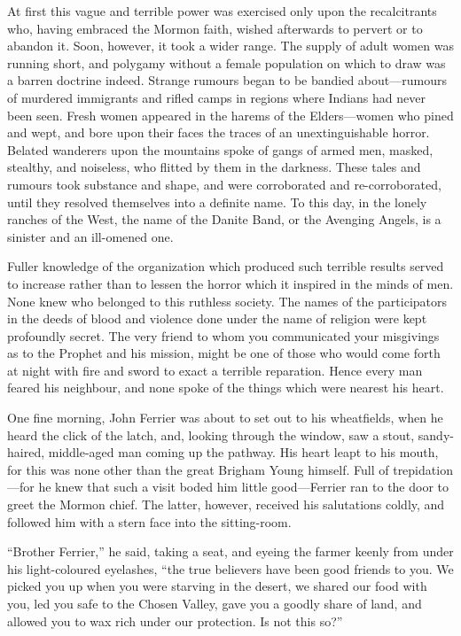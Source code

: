 \documentclass[12pt]{book}
\begin{document}
At first this vague and terrible power was exercised only upon the recalcitrants who, having embraced the Mormon faith, wished afterwards to pervert or to abandon it. Soon, however, it took a wider range. The supply of adult women was running short, and polygamy without a female population on which to draw was a barren doctrine indeed. Strange rumours began to be bandied about—rumours of murdered immigrants and rifled camps in regions where Indians had never been seen. Fresh women appeared in the harems of the Elders—women who pined and wept, and bore upon their faces the traces of an unextinguishable horror. Belated wanderers upon the mountains spoke of gangs of armed men, masked, stealthy, and noiseless, who flitted by them in the darkness. These tales and rumours took substance and shape, and were corroborated and re-corroborated, until they resolved themselves into a definite name. To this day, in the lonely ranches of the West, the name of the Danite Band, or the Avenging Angels, is a sinister and an ill-omened one. 

Fuller knowledge of the organization which produced such terrible results served to increase rather than to lessen the horror which it inspired in the minds of men. None knew who belonged to this ruthless society. The names of the participators in the deeds of blood and violence done under the name of religion were kept profoundly secret. The very friend to whom you communicated your misgivings as to the Prophet and his mission, might be one of those who would come forth at night with fire and sword to exact a terrible reparation. Hence every man feared his neighbour, and none spoke of the things which were nearest his heart. 

One fine morning, John Ferrier was about to set out to his wheatfields, when he heard the click of the latch, and, looking through the window, saw a stout, sandy-haired, middle-aged man coming up the pathway. His heart leapt to his mouth, for this was none other than the great Brigham Young himself. Full of trepidation—for he knew that such a visit boded him little good—Ferrier ran to the door to greet the Mormon chief. The latter, however, received his salutations coldly, and followed him with a stern face into the sitting-room. 

“Brother Ferrier,” he said, taking a seat, and eyeing the farmer keenly from under his light-coloured eyelashes, “the true believers have been good friends to you. We picked you up when you were starving in the desert, we shared our food with you, led you safe to the Chosen Valley, gave you a goodly share of land, and allowed you to wax rich under our protection. Is not this so?” 
\end{document}
